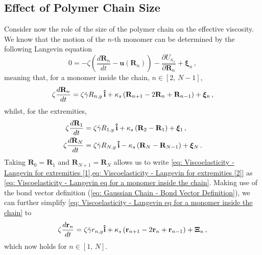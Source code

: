 \documentclass[../../main.tex]{subfiles}
\begin{document}
\subsection{Effect of Polymer Chain Size}
%
    Consider now the role of the size of the polymer chain on the effective viscosity. We know that the motion of the $n$-th monomer can be determined by the following Langevin equation
        \begin{equation}
            0 = -\zeta \left( \frac{d\mathbf{R}_n}{dt} - \mathbf{u}(\mathbf{R}_n) \right) - \frac{\partial U_{\kappa_s}}{\partial \mathbf{R}_n} + \bm{\xi}_n \,,
        \end{equation}
    meaning that, for a monomer inside the chain, $n \in [2,\, N-1]$,
        \begin{equation}\label{eq: Viscoelasticity - Langevin eq for a monomer inside the chain}
            \zeta\frac{d\mathbf{R}_n}{dt} = \zeta \Dot{\gamma} R_{n,y}\,\uvec{i} + \kappa_s\left( \mathbf{R}_{n+1} - 2\mathbf{R}_n + \mathbf{R}_{n-1} \right) + \bm{\xi}_n \,,
        \end{equation}
    whilst, for the extremities,
        \begin{align}
            \label{eq: Viscoelasticity - Langevin for extremities [1]}
            \zeta\frac{d\mathbf{R}_1}{dt} &= \zeta \Dot{\gamma} R_{1,y}\,\uvec{i} + \kappa_s\left( \mathbf{R}_{2} -\mathbf{R}_{1} \right) + \bm{\xi}_1 \,, \\
            \label{eq: Viscoelasticity - Langevin for extremities [2]}
            \zeta\frac{d\mathbf{R}_N}{dt} &= \zeta \Dot{\gamma} R_{N,y}\,\uvec{i} - \kappa_s\left( \mathbf{R}_N - \mathbf{R}_{N-1} \right) + \bm{\xi}_N \,.
        \end{align}
    Taking $\mathbf{R}_{0} = \mathbf{R}_{1}$ and $\mathbf{R}_{N+1} = \mathbf{R}_{N}$ allows us to write \cref{eq: Viscoelasticity - Langevin for extremities [1],eq: Viscoelasticity - Langevin for extremities [2]} as \cref{eq: Viscoelasticity - Langevin eq for a monomer inside the chain}. Making use of the bond vector definition (\cref{eq: Gaussian Chain - Bond Vector Definition}), we can further simplify \cref{eq: Viscoelasticity - Langevin eq for a monomer inside the chain} to
        \begin{equation}\label{eq: Viscoelasticity - Langevin eq for the bond vector}
            \zeta\frac{d\mathbf{r}_n}{dt} = \zeta \Dot{\gamma} r_{n,y}\uvec{i} + \kappa_s\left( \mathbf{r}_{n+1} - 2\mathbf{r}_n + \mathbf{r}_{n-1} \right) + \bm{\Xi}_n \,,
        \end{equation}
    which now holds for $n \in [1,\, N]$.
    
\end{document}
